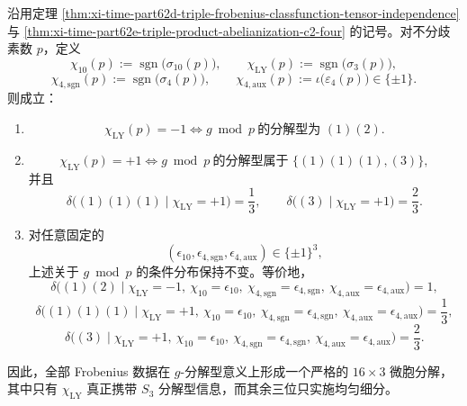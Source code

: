 \begin{theorem}\label{thm:xi-time-part62e-chi-ly-sole-controller}
沿用定理 \ref{thm:xi-time-part62d-triple-frobenius-classfunction-tensor-independence} 与
\ref{thm:xi-time-part62e-triple-product-abelianization-c2-four} 的记号。对不分歧素数 \(p\)，定义
\[
\chi_{10}(p):=\operatorname{sgn}\!\bigl(\sigma_{10}(p)\bigr),
\qquad
\chi_{\mathrm{LY}}(p):=\operatorname{sgn}\!\bigl(\sigma_3(p)\bigr),
\]
\[
\chi_{4,\mathrm{sgn}}(p):=\operatorname{sgn}\!\bigl(\sigma_4(p)\bigr),
\qquad
\chi_{4,\mathrm{aux}}(p):=\iota\!\bigl(\varepsilon_4(p)\bigr)\in\{\pm1\}.
\]
则成立：
\begin{enumerate}
  \item
  \[
  \chi_{\mathrm{LY}}(p)=-1
  \iff
  g\bmod p\ \text{的分解型为 }(1)(2).
  \]
  \item
  \[
  \chi_{\mathrm{LY}}(p)=+1
  \iff
  g\bmod p\ \text{的分解型属于 }\{(1)(1)(1),(3)\},
  \]
  并且
  \[
  \delta\!\bigl((1)(1)(1)\mid \chi_{\mathrm{LY}}=+1\bigr)=\frac13,
  \qquad
  \delta\!\bigl((3)\mid \chi_{\mathrm{LY}}=+1\bigr)=\frac23.
  \]
  \item 对任意固定的
  \[
  (\epsilon_{10},\epsilon_{4,\mathrm{sgn}},\epsilon_{4,\mathrm{aux}})\in\{\pm1\}^3,
  \]
  上述关于 \(g\bmod p\) 的条件分布保持不变。等价地，
  \[
  \delta\!\bigl((1)(2)\mid \chi_{\mathrm{LY}}=-1,\ \chi_{10}=\epsilon_{10},\ \chi_{4,\mathrm{sgn}}=\epsilon_{4,\mathrm{sgn}},\ \chi_{4,\mathrm{aux}}=\epsilon_{4,\mathrm{aux}}\bigr)=1,
  \]
  \[
  \delta\!\bigl((1)(1)(1)\mid \chi_{\mathrm{LY}}=+1,\ \chi_{10}=\epsilon_{10},\ \chi_{4,\mathrm{sgn}}=\epsilon_{4,\mathrm{sgn}},\ \chi_{4,\mathrm{aux}}=\epsilon_{4,\mathrm{aux}}\bigr)=\frac13,
  \]
  \[
  \delta\!\bigl((3)\mid \chi_{\mathrm{LY}}=+1,\ \chi_{10}=\epsilon_{10},\ \chi_{4,\mathrm{sgn}}=\epsilon_{4,\mathrm{sgn}},\ \chi_{4,\mathrm{aux}}=\epsilon_{4,\mathrm{aux}}\bigr)=\frac23.
  \]
\end{enumerate}
因此，全部 Frobenius 数据在 \(g\)-分解型意义上形成一个严格的 \(16\times 3\) 微胞分解，其中只有 \(\chi_{\mathrm{LY}}\) 真正携带 \(S_3\) 分解型信息，而其余三位只实施均匀细分。
\end{theorem}
